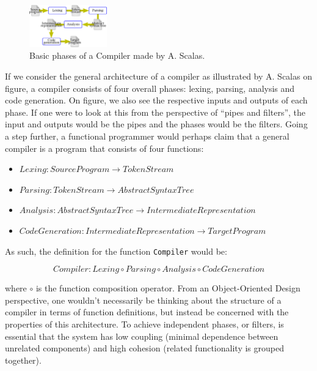 \begin{figure}[H]
\centering
\includegraphics[width=0.3\textwidth]{Pictures/basic_compiler_phases.png}
\caption{Basic phases of a Compiler made by A. Scalas.}
\label{fig:compiler_phases}
\end{figure}

If we consider the general architecture of a compiler as illustrated by A. Scalas on figure, a compiler consists of four overall phases:
lexing, parsing, analysis and code generation. On figure, we also see the respective inputs and outputs of each phase. If one were to
look at this from the perspective of ``pipes and filters'', the input and outputs would be the pipes and the phases would be the filters.
Going a step further, a functional programmer would perhaps claim that a general compiler is a program that consists of four functions:

\begin{itemize}
  \item $Lexing : SourceProgram \rightarrow TokenStream$
  \item $Parsing : TokenStream \rightarrow AbstractSyntaxTree$
  \item $Analysis : AbstractSyntaxTree \rightarrow IntermediateRepresentation$
  \item $CodeGeneration : IntermediateRepresentation \rightarrow TargetProgram$
\end{itemize}

As such, the definition for the function \texttt{Compiler} would be:

\begin{equation*}
  Compiler : Lexing \circ Parsing \circ Analysis \circ CodeGeneration
\end{equation*}

where $\circ$ is the function composition operator. From an Object-Oriented Design perspective, one wouldn't necessarily be thinking about the structure
of a compiler in terms of function definitions, but instead be concerned with the properties of this architecture. To achieve independent phases, or filters,
is essential that the system has low coupling (minimal dependence between unrelated components) and high cohesion (related functionality is grouped together).

